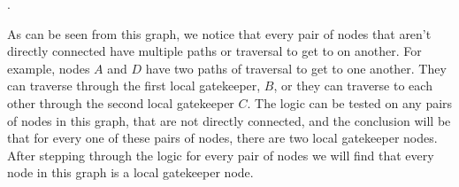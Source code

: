 \documentclass[11pt]{article}
\begin{document}
{\begin{enumerate}
\begin{enumerate}[(a)]
\begin{center}
.
	\end{center}
As can be seen from this graph, we notice that every pair of nodes that aren't directly connected have multiple paths or traversal to get to on another.  For example, nodes $A$ and $D$ have two paths of traversal to get to one another.  They can traverse through the first local gatekeeper, $B$, or they can traverse to each other through the second local gatekeeper $C$.  The logic can be tested on any pairs of nodes in this graph, that are not directly connected, and the conclusion will be that for every one of these pairs of nodes, there are two local gatekeeper nodes.  After stepping through the logic for every pair of nodes we will find that every node in this graph is a local gatekeeper node.
	\end{enumerate}
\end{enumerate}
}
\end{document}
